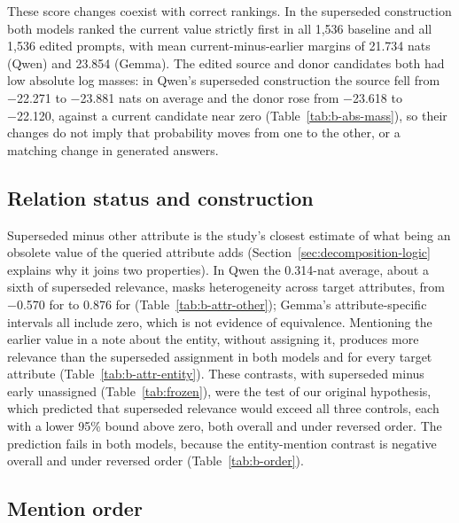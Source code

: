 These score changes coexist with correct rankings. In the superseded construction both models ranked the current value strictly first in all 1,536 baseline and all 1,536 edited prompts, with mean current-minus-earlier margins of 21.734 nats (Qwen) and 23.854 (Gemma). The edited source and donor candidates both had low absolute log masses: in Qwen's superseded construction the source fell from −22.271 to −23.881 nats on average and the donor rose from −23.618 to −22.120, against a current candidate near zero (Table~\ref{tab:b-abs-mass}), so their changes do not imply that probability moves from one to the other, or a matching change in generated answers.

\subsection{Relation status and construction}
\label{sec:relation}

Superseded minus other attribute is the study's closest estimate of what being an obsolete value of the queried attribute adds (Section~\ref{sec:decomposition-logic} explains why it joins two properties). In Qwen the 0.314-nat average, about a sixth of superseded relevance, masks heterogeneity across target attributes, from −0.570 for  to 0.876 for  (Table~\ref{tab:b-attr-other}); Gemma's attribute-specific intervals all include zero, which is not evidence of equivalence. Mentioning the earlier value in a note about the entity, without assigning it, produces more relevance than the superseded assignment in both models and for every target attribute (Table~\ref{tab:b-attr-entity}). These contrasts, with superseded minus early unassigned (Table~\ref{tab:frozen}), were the test of our original hypothesis, which predicted that superseded relevance would exceed all three controls, each with a lower 95\% bound above zero, both overall and under reversed order. The prediction fails in both models, because the entity-mention contrast is negative overall and under reversed order (Table~\ref{tab:b-order}).

\subsection{Mention order}
\label{sec:order}

